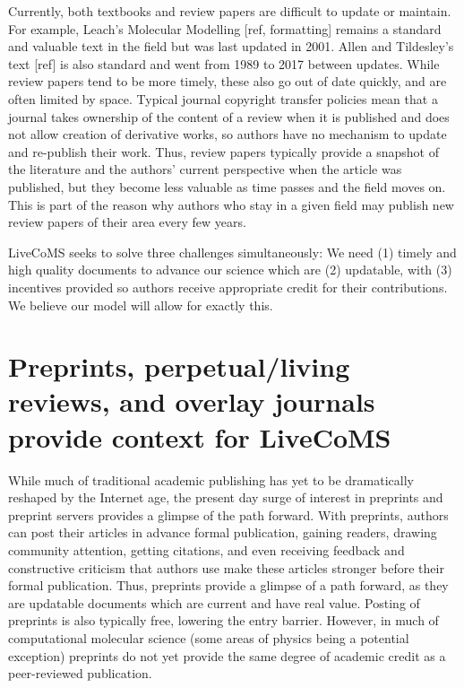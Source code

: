 \documentclass[9pt]{livecoms}
\begin{document}
Currently, both textbooks and review papers are difficult to update or maintain.
For example, Leach's Molecular Modelling [ref, formatting] remains a standard and valuable text in the field but was last updated in 2001.
Allen and Tildesley's text [ref] is also standard and went from 1989 to 2017 between updates. 
While review papers tend to be more timely, these also go out of date quickly, and are often limited by space. 
Typical journal copyright transfer policies mean that a journal takes ownership of the content of a review when it is published and does not allow creation of derivative works, so authors have no mechanism to update and re-publish their work.
Thus, review papers typically provide a snapshot of the literature and the authors' current perspective when the article was published, but they become less valuable as time passes and the field moves on.
This is part of the reason why authors who stay in a given field may publish new review papers of their area every few years. 

LiveCoMS seeks to solve three challenges simultaneously: We need (1) timely and high quality documents to advance our science which are (2) updatable, with (3) incentives provided so authors receive appropriate credit for their contributions.
We believe our model will allow for exactly this. 

\section{Preprints, perpetual/living reviews, and overlay journals provide context for LiveCoMS}

While much of traditional academic publishing has yet to be dramatically reshaped by the Internet age, the present day surge of interest in preprints and preprint servers provides a glimpse of the path forward.
With preprints, authors can post their articles in advance formal publication, gaining readers, drawing community attention, getting citations, and even receiving feedback and constructive criticism that authors use make these articles stronger before their formal publication.
Thus, preprints provide a glimpse of a path forward, as they are updatable documents which are current and have real value.
Posting of preprints is also typically free, lowering the entry barrier. 
However, in much of computational molecular science (some areas of physics being a potential exception) preprints do not yet provide the same degree of academic credit as a peer-reviewed publication. 
\end{document}
